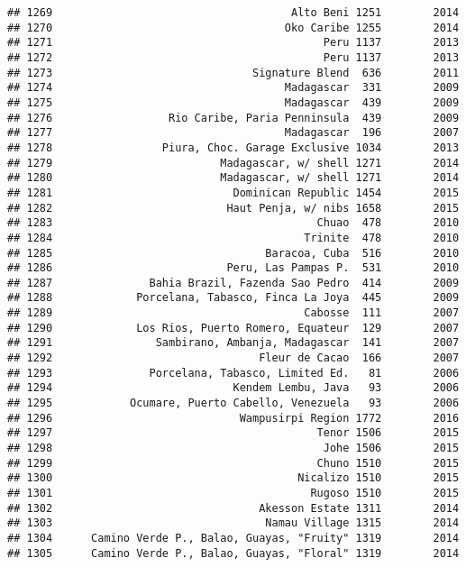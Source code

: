 \documentclass[
]{article}
\begin{document}
\begin{verbatim}
## 1269                                     Alto Beni 1251        2014
## 1270                                    Oko Caribe 1255        2014
## 1271                                          Peru 1137        2013
## 1272                                          Peru 1137        2013
## 1273                               Signature Blend  636        2011
## 1274                                    Madagascar  331        2009
## 1275                                    Madagascar  439        2009
## 1276                  Rio Caribe, Paria Penninsula  439        2009
## 1277                                    Madagascar  196        2007
## 1278                 Piura, Choc. Garage Exclusive 1034        2013
## 1279                          Madagascar, w/ shell 1271        2014
## 1280                          Madagascar, w/ shell 1271        2014
## 1281                            Dominican Republic 1454        2015
## 1282                           Haut Penja, w/ nibs 1658        2015
## 1283                                         Chuao  478        2010
## 1284                                       Trinite  478        2010
## 1285                                 Baracoa, Cuba  516        2010
## 1286                           Peru, Las Pampas P.  531        2010
## 1287               Bahia Brazil, Fazenda Sao Pedro  414        2009
## 1288             Porcelana, Tabasco, Finca La Joya  445        2009
## 1289                                       Cabosse  111        2007
## 1290             Los Rios, Puerto Romero, Equateur  129        2007
## 1291                Sambirano, Ambanja, Madagascar  141        2007
## 1292                                Fleur de Cacao  166        2007
## 1293               Porcelana, Tabasco, Limited Ed.   81        2006
## 1294                            Kendem Lembu, Java   93        2006
## 1295            Ocumare, Puerto Cabello, Venezuela   93        2006
## 1296                             Wampusirpi Region 1772        2016
## 1297                                         Tenor 1506        2015
## 1298                                          Johe 1506        2015
## 1299                                         Chuno 1510        2015
## 1300                                      Nicalizo 1510        2015
## 1301                                        Rugoso 1510        2015
## 1302                                Akesson Estate 1311        2014
## 1303                                 Namau Village 1315        2014
## 1304      Camino Verde P., Balao, Guayas, "Fruity" 1319        2014
## 1305      Camino Verde P., Balao, Guayas, "Floral" 1319        2014

\end{verbatim}
\end{document}
